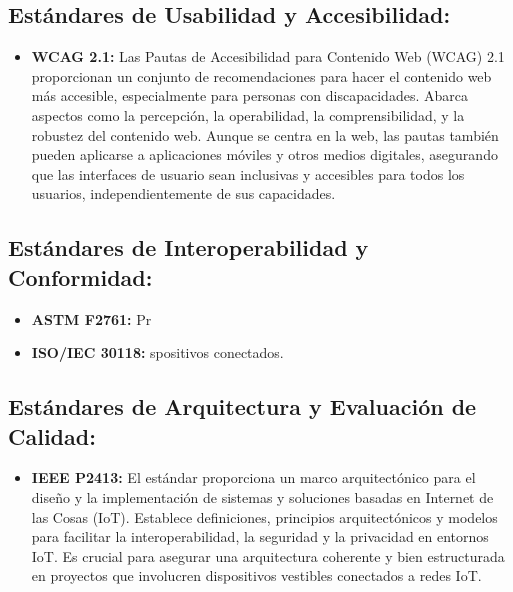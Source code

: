 \subsection{Estándares de Usabilidad y Accesibilidad:}

\begin{itemize}
  \item \textbf{WCAG 2.1:} Las Pautas de Accesibilidad para Contenido Web (WCAG) 2.1 proporcionan un conjunto de recomendaciones para hacer el contenido web más accesible, especialmente para personas con discapacidades. Abarca aspectos como la percepción, la operabilidad, la comprensibilidad, y la robustez del contenido web. Aunque se centra en la web, las pautas también pueden aplicarse a aplicaciones móviles y otros medios digitales, asegurando que las interfaces de usuario sean inclusivas y accesibles para todos los usuarios, independientemente de sus capacidades. 

\end{itemize}

\subsection{Estándares de Interoperabilidad y Conformidad:}

\begin{itemize}
  \item \textbf{ASTM F2761:} Pr

  \item \textbf{ISO/IEC 30118:} spositivos conectados. 
\end{itemize}

\subsection{Estándares de Arquitectura y Evaluación de Calidad:}

\begin{itemize}
  \item \textbf{IEEE P2413:} El estándar proporciona un marco arquitectónico para el diseño y la implementación de sistemas y soluciones basadas en Internet de las Cosas (IoT). Establece definiciones, principios arquitectónicos y modelos para facilitar la interoperabilidad, la seguridad y la privacidad en entornos IoT. Es crucial para asegurar una arquitectura coherente y bien estructurada en proyectos que involucren dispositivos vestibles conectados a redes IoT. 

\end{itemize}
